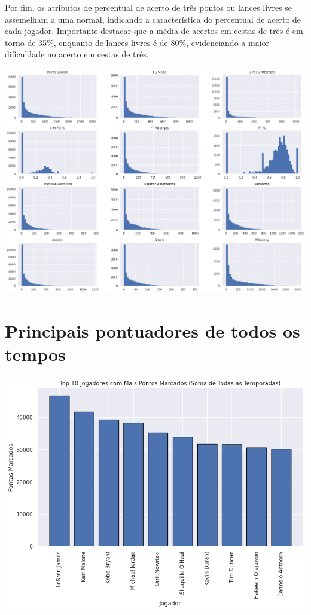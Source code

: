 \documentclass[
]{book}
\begin{document}
Por fim, os atributos de percentual de acerto de três pontos ou lances livres se assemelham a uma normal, indicando a característica do percentual de acerto de cada jogador. Importante destacar que a média de acertos em cestas de três é em torno de 35\%, enquanto de lances livres é de 80\%, evidenciando a maior dificuldade no acerto em cestas de três.

\includegraphics{imagens/15.png}

\hypertarget{principais-pontuadores-de-todos-os-tempos}{%
\section{Principais pontuadores de todos os tempos}\label{principais-pontuadores-de-todos-os-tempos}}

\includegraphics{imagens/16.png}
\end{document}
